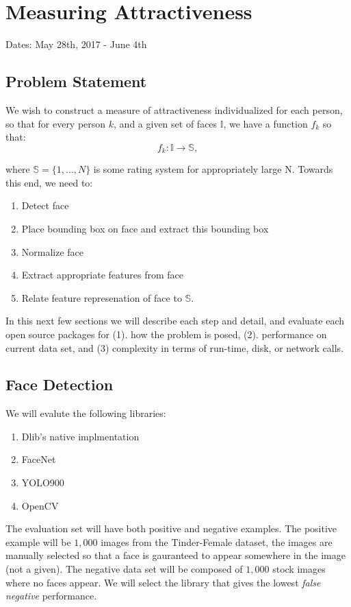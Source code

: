\section{Measuring Attractiveness}

Dates: May 28th,  2017 - June 4th


\subsection{Problem Statement}

We wish to construct a measure of attractiveness individualized for each person, so that for every person $k$, and a given set of faces $\mathbb{I}$, we have a function $f_k$ so that:
	\[
		f_k : \mathbb{I} \rightarrow \mathbb{S},
	\]

where $\mathbb{S} = \{1,\ldots,N\}$ is some rating system for appropriately large N. Towards this end, we need to:

\begin{enumerate}
	\item Detect face
	\item Place bounding box on face and extract this bounding box
	\item Normalize face
	\item Extract appropriate features from face 
	\item Relate feature represenation of face to $\mathbb{S}$.
\end{enumerate}

In this next few sections we will describe each step and detail, and evaluate each open source packages for (1). how the problem is posed, (2). performance on current data set, and (3) complexity in terms of run-time, disk, or network calls. 

\subsection{Face Detection}

We will evalute the following libraries:

\begin{enumerate}
	\item Dlib's native implmentation
	\item FaceNet
	\item YOLO900
	\item OpenCV
\end{enumerate}

The evaluation set will have both positive and negative examples. The positive example will be $1,000$ images from the Tinder-Female dataset, the images are manually selected so that a face is gauranteed to appear somewhere in the image (not a given). The negative data set will be composed of $1,000$ stock images where no faces appear. We will select the library that gives the lowest \textit{false negative} performance.

